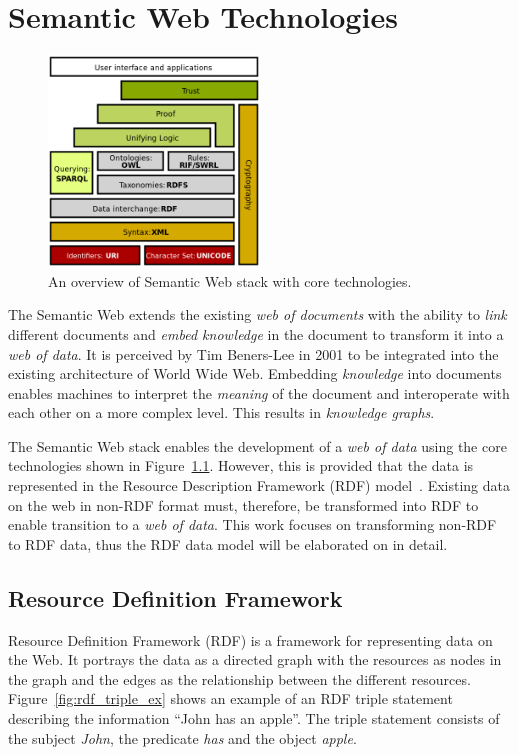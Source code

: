 \chapter{Semantic Web Technologies}
\label{chap:semantic_web}


\begin{figure}[htbp]
    \centering
    \includegraphics[width=0.5\textwidth]{fig/Semantic_web_stack.svg.png}
    \caption{An overview of Semantic Web stack with core technologies\cite{sem_web_stack}.}
    \label{fig:sem_web_stack}
\end{figure}

The Semantic Web extends the existing \emph{web of documents} with the ability 
to \emph{link} different documents and \emph{embed knowledge} in the document
to transform it into a \emph{web of data}. It is perceived by Tim Beners-Lee in 
2001\cite{bernerslee2001semantic} to be integrated into the existing architecture 
of World Wide Web. Embedding \emph{knowledge} into documents enables machines to
interpret the \emph{meaning} of the document and interoperate with each other on 
a more complex level. This results in \emph{knowledge graphs}. 

The Semantic Web stack enables the development of a \emph{web of data} using 
the core technologies shown in Figure~\ref{fig:sem_web_stack}. 
However, this is provided that the data is represented in the 
Resource Description Framework (RDF) model~\cite{rdf_concepts}. 
Existing data on the web in non-RDF format must, therefore, be transformed 
into RDF to enable transition to a \emph{web of data}. This work 
focuses on transforming non-RDF to RDF data, thus the RDF data model will be elaborated on
in detail. 



\section{Resource Definition Framework}
Resource Definition Framework (RDF) \cite{rdf_concepts} is a framework for representing data on the Web.
It portrays the data as a directed graph with the resources as nodes in the graph and the
edges as the relationship between the different resources.
Figure~\ref{fig:rdf_triple_ex} shows an example of an RDF triple statement describing
the information “John has an apple”.
The triple statement consists of the subject \textit{John}, the predicate \textit{has}
and the object \textit{apple}.

